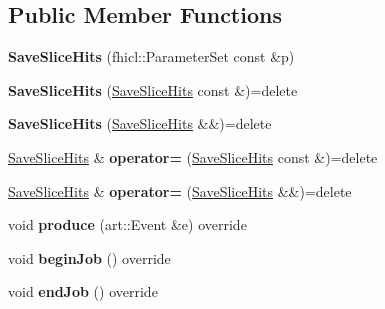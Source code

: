 \subsection*{Public Member Functions}
\begin{DoxyCompactItemize}
\item 
{\bfseries Save\+Slice\+Hits} (fhicl\+::\+Parameter\+Set const \&p)\hypertarget{classSaveSliceHits_a56e7e4878a9c004791e1d5a1c0555cd2}{}\label{classSaveSliceHits_a56e7e4878a9c004791e1d5a1c0555cd2}

\item 
{\bfseries Save\+Slice\+Hits} (\hyperlink{classSaveSliceHits}{Save\+Slice\+Hits} const \&)=delete\hypertarget{classSaveSliceHits_a21f4a1e618ae4562dd6aa2612f06849b}{}\label{classSaveSliceHits_a21f4a1e618ae4562dd6aa2612f06849b}

\item 
{\bfseries Save\+Slice\+Hits} (\hyperlink{classSaveSliceHits}{Save\+Slice\+Hits} \&\&)=delete\hypertarget{classSaveSliceHits_a277a656266a5bfdac6491f0a59b8e441}{}\label{classSaveSliceHits_a277a656266a5bfdac6491f0a59b8e441}

\item 
\hyperlink{classSaveSliceHits}{Save\+Slice\+Hits} \& {\bfseries operator=} (\hyperlink{classSaveSliceHits}{Save\+Slice\+Hits} const \&)=delete\hypertarget{classSaveSliceHits_ab30b09c8d4e1e79dfb9f105f412c90a1}{}\label{classSaveSliceHits_ab30b09c8d4e1e79dfb9f105f412c90a1}

\item 
\hyperlink{classSaveSliceHits}{Save\+Slice\+Hits} \& {\bfseries operator=} (\hyperlink{classSaveSliceHits}{Save\+Slice\+Hits} \&\&)=delete\hypertarget{classSaveSliceHits_ae5329e70a6f07aef0b9a958a6abd0560}{}\label{classSaveSliceHits_ae5329e70a6f07aef0b9a958a6abd0560}

\item 
void {\bfseries produce} (art\+::\+Event \&e) override\hypertarget{classSaveSliceHits_abec4f170d648b1855d5f26b563148cf6}{}\label{classSaveSliceHits_abec4f170d648b1855d5f26b563148cf6}

\item 
void {\bfseries begin\+Job} () override\hypertarget{classSaveSliceHits_a0ebe38a8c4f48a1d9c405787d076635a}{}\label{classSaveSliceHits_a0ebe38a8c4f48a1d9c405787d076635a}

\item 
void {\bfseries end\+Job} () override\hypertarget{classSaveSliceHits_a48f6a563a927b9ff37d3a6f07462d8fd}{}\label{classSaveSliceHits_a48f6a563a927b9ff37d3a6f07462d8fd}

\end{DoxyCompactItemize}
